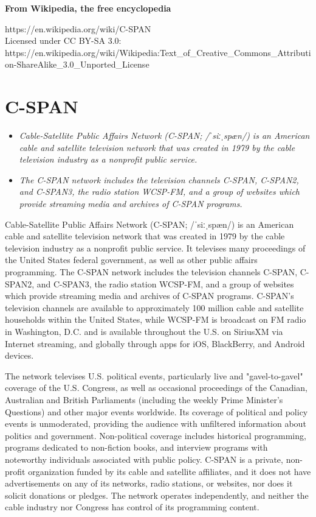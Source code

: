 \textbf{From Wikipedia, the free encyclopedia}

https://en.wikipedia.org/wiki/C-SPAN\\
Licensed under CC BY-SA 3.0:\\
https://en.wikipedia.org/wiki/Wikipedia:Text\_of\_Creative\_Commons\_Attribution-ShareAlike\_3.0\_Unported\_License

\section{C-SPAN}\label{c-span}

\begin{itemize}
\item
  \emph{Cable-Satellite Public Affairs Network (C-SPAN; /ˈsiːˌspæn/) is
  an American cable and satellite television network that was created in
  1979 by the cable television industry as a nonprofit public service.}
\item
  \emph{The C-SPAN network includes the television channels C-SPAN,
  C-SPAN2, and C-SPAN3, the radio station WCSP-FM, and a group of
  websites which provide streaming media and archives of C-SPAN
  programs.}
\end{itemize}

Cable-Satellite Public Affairs Network (C-SPAN; /ˈsiːˌspæn/) is an
American cable and satellite television network that was created in 1979
by the cable television industry as a nonprofit public service. It
televises many proceedings of the United States federal government, as
well as other public affairs programming. The C-SPAN network includes
the television channels C-SPAN, C-SPAN2, and C-SPAN3, the radio station
WCSP-FM, and a group of websites which provide streaming media and
archives of C-SPAN programs. C-SPAN's television channels are available
to approximately 100 million cable and satellite households within the
United States, while WCSP-FM is broadcast on FM radio in Washington,
D.C. and is available throughout the U.S. on SiriusXM via Internet
streaming, and globally through apps for iOS, BlackBerry, and Android
devices.

The network televises U.S. political events, particularly live and
"gavel-to-gavel" coverage of the U.S. Congress, as well as occasional
proceedings of the Canadian, Australian and British Parliaments
(including the weekly Prime Minister's Questions) and other major events
worldwide. Its coverage of political and policy events is unmoderated,
providing the audience with unfiltered information about politics and
government. Non-political coverage includes historical programming,
programs dedicated to non-fiction books, and interview programs with
noteworthy individuals associated with public policy. C-SPAN is a
private, non-profit organization funded by its cable and satellite
affiliates, and it does not have advertisements on any of its networks,
radio stations, or websites, nor does it solicit donations or pledges.
The network operates independently, and neither the cable industry nor
Congress has control of its programming content.

